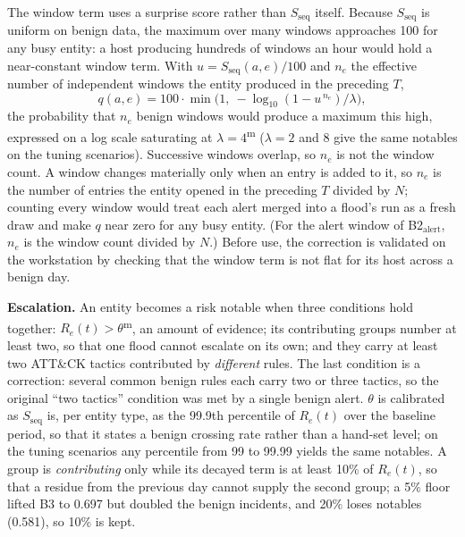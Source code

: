 \documentclass[conference]{IEEEtran}
\newcommand{\meas}{\textsuperscript{\textcolor{green!45!black}{m}}}    %
\begin{document}
The window term uses a surprise score rather than $S_\mathrm{seq}$ itself. Because $S_\mathrm{seq}$ is uniform on benign data, the maximum over many windows approaches 100 for any busy entity: a host producing hundreds of windows an hour would hold a near-constant window term. With $u = S_\mathrm{seq}(a,e)/100$ and $n_e$ the effective number of independent windows the entity produced in the preceding $T$,
\begin{equation}
q(a, e) = 100 \cdot \min\!\big(1,\ -\log_{10}(1 - u^{\,n_e}) / \lambda \big),
\end{equation}
the probability that $n_e$ benign windows would produce a maximum this high, expressed on a log scale saturating at $\lambda = 4$\meas{} ($\lambda = 2$ and 8 give the same notables on the tuning scenarios). Successive windows overlap, so $n_e$ is not the window count. A window changes materially only when an entry is added to it, so $n_e$ is the number of entries the entity opened in the preceding $T$ divided by $N$; counting every window would treat each alert merged into a flood's run as a fresh draw and make $q$ near zero for any busy entity. (For the alert window of B2$_\mathrm{alert}$, $n_e$ is the window count divided by $N$.) Before use, the correction is validated on the workstation by checking that the window term is not flat for its host across a benign day.

\textbf{Escalation.} An entity becomes a risk notable when three conditions hold together: $R_e(t) > \theta$\meas{}, an amount of evidence; its contributing groups number at least two, so that one flood cannot escalate on its own; and they carry at least two ATT\&CK tactics contributed by \emph{different} rules. The last condition is a correction: several common benign rules each carry two or three tactics, so the original ``two tactics'' condition was met by a single benign alert. $\theta$ is calibrated as $S_\mathrm{seq}$ is, per entity type, as the 99.9th percentile of $R_e(t)$ over the baseline period, so that it states a benign crossing rate rather than a hand-set level; on the tuning scenarios any percentile from 99 to 99.99 yields the same notables. A group is \emph{contributing} only while its decayed term is at least 10\% of $R_e(t)$, so that a residue from the previous day cannot supply the second group; a 5\% floor lifted B3 to 0.697 but doubled the benign incidents, and 20\% loses notables (0.581), so 10\% is kept.
\end{document}
